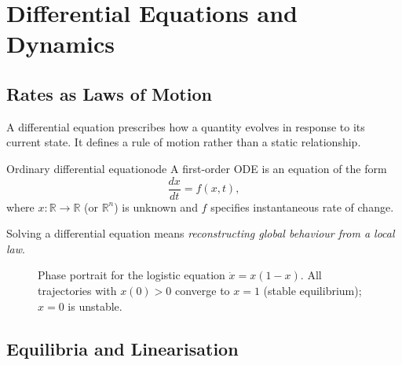 \documentclass[12pt,openany]{book}
\newcommand{\R}{\mathbb{R}}
\begin{document}
\chapter{Differential Equations and Dynamics}
\label{ch:ode}

\section{Rates as Laws of Motion}

A differential equation prescribes how a quantity evolves in response to its
current state. It defines a rule of motion rather than a static relationship.

\begin{definition}{Ordinary differential equation}{ode}
  A first-order ODE is an equation of the form
  \[
    \frac{dx}{dt} = f(x,t),
  \]
  where $x:\R\to\R$ (or $\R^n$) is unknown and $f$ specifies instantaneous
  rate of change.
\end{definition}

Solving a differential equation means \emph{reconstructing global behaviour
from a local law}.

\begin{figure}[H]
\centering
{}
\caption{Phase portrait for the logistic equation $\dot x = x(1-x)$. All
trajectories with $x(0)>0$ converge to $x=1$ (stable equilibrium); $x=0$ is
unstable.}
\label{fig:logistic}
\end{figure}

\section{Equilibria and Linearisation}
\end{document}
